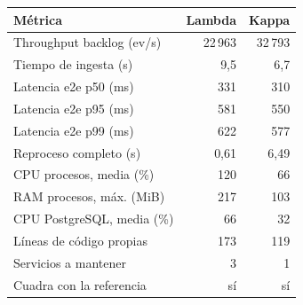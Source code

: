 \begin{tabular}{@{}lrr@{}}
\toprule
Métrica & Lambda & Kappa \\
\midrule
Throughput backlog (ev/s) & 22\,963 & 32\,793 \\
Tiempo de ingesta (s) & 9,5 & 6,7 \\
Latencia e2e p50 (ms) & 331 & 310 \\
Latencia e2e p95 (ms) & 581 & 550 \\
Latencia e2e p99 (ms) & 622 & 577 \\
Reproceso completo (s) & 0,61 & 6,49 \\
CPU procesos, media (\%) & 120 & 66 \\
RAM procesos, máx. (MiB) & 217 & 103 \\
CPU PostgreSQL, media (\%) & 66 & 32 \\
Líneas de código propias & 173 & 119 \\
Servicios a mantener & 3 & 1 \\
Cuadra con la referencia & sí & sí \\
\bottomrule
\end{tabular}
